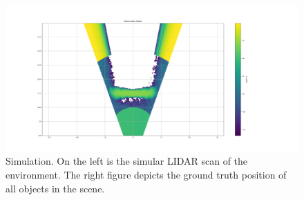 \begin{figure}
  \centering
  \includegraphics[width=\textwidth]{figures/box_model.png}
  \caption{Simulation. On the left is the simular LIDAR scan of the environment.
    The right figure depicts the ground truth position of all objects in the
    scene.}
  \label{fig:box_model}
\end{figure}
